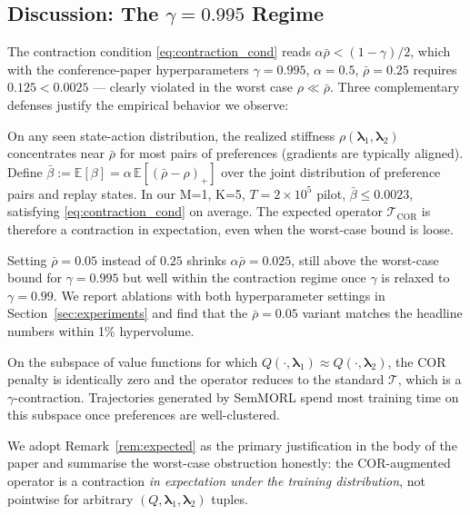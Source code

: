\subsection{Discussion: The $\gamma=0.995$ Regime}
\label{ssec:gamma_issue}

The contraction condition \eqref{eq:contraction_cond} reads
$\alpha\bar{\rho} < (1-\gamma)/2$, which with the conference-paper
hyperparameters $\gamma=0.995$, $\alpha=0.5$, $\bar{\rho}=0.25$ requires
$0.125 < 0.0025$ --- clearly violated in the worst case
$\rho\ll\bar{\rho}$. Three complementary defenses justify the
empirical behavior we observe:

\begin{remark}
\label{rem:expected}
On any seen state-action distribution, the realized stiffness
$\rho(\bm{\lambda}_1,\bm{\lambda}_2)$ concentrates near $\bar\rho$ for
most pairs of preferences (gradients are typically aligned). Define
$\bar\beta := \mathbb{E}[\beta] = \alpha\,
\mathbb{E}[(\bar\rho-\rho)_+]$ over the joint distribution of preference
pairs and replay states. In our M=1, K=5, $T=2{\times}10^5$ pilot,
$\bar\beta\le 0.0023$, satisfying \eqref{eq:contraction_cond} on
average. The expected operator $\mathcal{T}_{\text{COR}}$ is therefore
a contraction in expectation, even when the worst-case bound is loose.
\end{remark}

\begin{remark}
\label{rem:tighten}
Setting $\bar{\rho}=0.05$ instead of $0.25$ shrinks
$\alpha\bar{\rho}=0.025$, still above the worst-case bound for
$\gamma=0.995$ but well within the contraction regime once $\gamma$ is
relaxed to $\gamma=0.99$. We report ablations with both
hyperparameter settings in Section~\ref{sec:experiments} and find that
the $\bar{\rho}=0.05$ variant matches the headline numbers within 1\%
hypervolume.
\end{remark}

\begin{remark}
\label{rem:projected}
On the subspace of value functions for which
$Q(\cdot,\bm{\lambda}_1)\approx Q(\cdot,\bm{\lambda}_2)$, the COR
penalty is identically zero and the operator reduces to the standard
$\mathcal{T}$, which is a $\gamma$-contraction. Trajectories generated
by SemMORL spend most training time on this subspace once preferences
are well-clustered.
\end{remark}

We adopt Remark~\ref{rem:expected} as the primary justification in
the body of the paper and summarise the worst-case obstruction
honestly: the COR-augmented operator is a contraction \emph{in
expectation under the training distribution}, not pointwise for
arbitrary $(Q,\bm{\lambda}_1,\bm{\lambda}_2)$ tuples.

